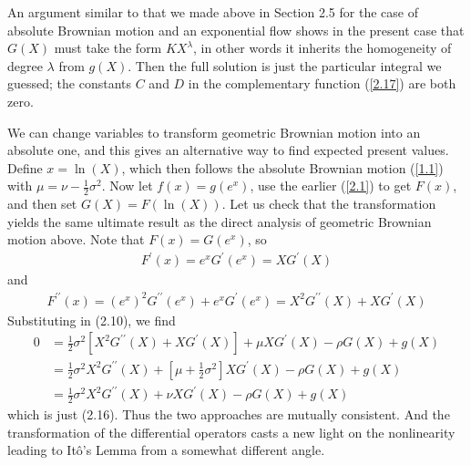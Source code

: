 \documentclass[12pt]{article}
\theoremstyle{definition}
\begin{document}
An argument similar to that we made above in Section 2.5 for the case of absolute Brownian motion and an exponential flow shows in the present case that $G(X)$ must take the form $K X^{\lambda}$, in other words it inherits the homogeneity of degree $\lambda$ from $g(X)$. Then the full solution is just the particular integral we guessed; the constants $C$ and $D$ in the complementary function (\ref{2.17}) are both zero.

We can change variables to transform geometric Brownian motion into an absolute one, and this gives an alternative way to find expected present values. Define $x=\ln (X)$, which then follows the absolute Brownian motion (\ref{1.1}) with $\mu=\nu-\frac{1}{2} \sigma^{2}$. Now let $f(x)=g\left(e^{x}\right)$, use the earlier (\ref{2.1}) to get $F(x)$, and then set $G(X)=F(\ln (X))$. Let us check that the transformation yields the same ultimate result as the direct analysis of geometric Brownian motion above. Note that $F(x)=G\left(e^{x}\right)$, so
\begin{align*}
F^{\prime}(x)=e^{x} G^{\prime}\left(e^{x}\right)=X G^{\prime}(X)
\end{align*}
and
\begin{align*}
F^{\prime \prime}(x)=\left(e^{x}\right)^{2} G^{\prime \prime}\left(e^{x}\right)+e^{x} G^{\prime}\left(e^{x}\right)=X^{2} G^{\prime \prime}(X)+X G^{\prime}(X)
\end{align*}
Substituting in (2.10), we find
\begin{align*}
0 & =\frac{1}{2} \sigma^{2}\left[X^{2} G^{\prime \prime}(X)+X G^{\prime}(X)\right]+\mu X G^{\prime}(X)-\rho G(X)+g(X) \\
& =\frac{1}{2} \sigma^{2} X^{2} G^{\prime \prime}(X)+\left[\mu+\frac{1}{2} \sigma^{2}\right] X G^{\prime}(X)-\rho G(X)+g(X) \\
& =\frac{1}{2} \sigma^{2} X^{2} G^{\prime \prime}(X)+\nu X G^{\prime}(X)-\rho G(X)+g(X)
\end{align*}
which is just (2.16). Thus the two approaches are mutually consistent. And the transformation of the differential operators casts a new light on the nonlinearity leading to Itô's Lemma from a somewhat different angle.
\end{document}
